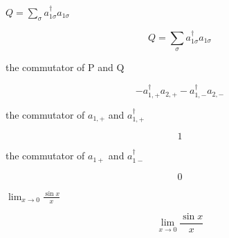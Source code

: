 \documentclass[dvipdfmx]{article}
\begin{document}
$Q = \sum_\sigma a^\dagger_{1\sigma} a_{1\sigma}$

\begin{equation}
  Q = \sum_\sigma a^\dagger_{1\sigma} a_{1\sigma}
  \label{eq:E9}
\end{equation}

the commutator of P and Q

\begin{equation}
  - {a}_{1{,+}}^{\dagger} {a}_{2{,+}} - {a}_{1{,-}}^{\dagger} {a}_{2{,-}}
  \label{eq:E10}
\end{equation}

the commutator of $a_{1,+}$ and $a^\dagger_{1,+}$

\begin{equation}
  1
  \label{eq:E11}
\end{equation}

the commutator of $a_{1+}$ and $a^\dagger_{1-}$

\begin{equation}
  0
  \label{eq:E12}
\end{equation}

$\lim_{x \to 0} \frac{\sin x}{x}$

\begin{equation}
  \lim_{x \to 0} \frac{\sin x}{x}
  \label{eq:E13}
\end{equation}
\end{document}
